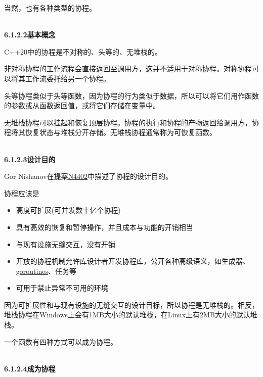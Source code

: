 当然，也有各种类型的协程。

\hspace*{\fill} \\ %
\noindent
\textbf{6.1.2.2\hspace{0.2cm}基本概念}

C++20中的协程是不对称的、头等的、无堆栈的。

非对称协程的工作流程会直接返回至调用方，这并不适用于对称协程。对称协程可以将其工作流委托给另一个协程。

头等协程类似于头等函数，因为协程的行为类似于数据，所以可以将它们用作函数的参数或从函数返回值，或将它们存储在变量中。

无堆栈协程可以挂起和恢复顶层协程。协程的执行和协程的产物返回给调用方，协程将其恢复状态与堆栈分开存储。无堆栈协程通常称为可恢复函数。

\hspace*{\fill} \\ %
\noindent
\textbf{6.1.2.3\hspace{0.2cm}设计目的}

Gor Nishanov在提案\href{https://isocpp.org/files/papers/N4402.pdf}{N4402}中描述了协程的设计目的。

协程应该是

\begin{itemize}
\item 
高度可扩展(可并发数十亿个协程)

\item 
具有高效的恢复和暂停操作，并且成本与功能的开销相当

\item 
与现有设施无缝交互，没有开销

\item 
开放的协程机制允许库设计者开发协程库，公开各种高级语义，如生成器、\href{https://tour.golang.org/concurrency/1}{goroutines}、任务等

\item 
可用于禁止异常不可用的环境
\end{itemize}

因为可扩展性和与现有设施的无缝交互的设计目标，所以协程是无堆栈的。相反，堆栈协程在Windows上会有1MB大小的默认堆栈，在Linux上有2MB大小的默认堆栈。

一个函数有四种方式可以成为协程。

\hspace*{\fill} \\ %
\noindent
\textbf{6.1.2.4\hspace{0.2cm}成为协程}

